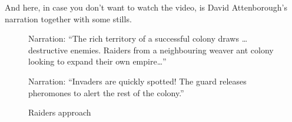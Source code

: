\documentclass[
  letterpaper,
  DIV=11,
  numbers=noendperiod]{scrartcl}
\begin{document}
And here, in case you don't want to watch the video, is David
Attenborough's narration together with some stills.

\begin{figure}

\begin{minipage}[t]{0.50\linewidth}

{\centering 

Narration: ``The rich territory of a successful colony draws \ldots{}
destructive enemies. Raiders from a neighbouring weaver ant colony
looking to expand their own empire\ldots{}''

}

\end{minipage}%
%
\begin{minipage}[t]{0.50\linewidth}

{\centering 


\caption{\label{fig-weaver-ants-1}Raiders approach}

}

\end{minipage}%
\newline
\begin{minipage}[t]{0.50\linewidth}

{\centering 

Narration: ``Invaders are quickly spotted! The guard releases pheromones
to alert the rest of the colony.''

}

\end{minipage}%
%
\begin{minipage}[t]{0.50\linewidth}


\end{minipage}
\end{figure}
\end{document}
